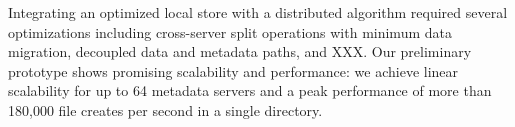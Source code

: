 Integrating an optimized local store with a distributed algorithm required
several optimizations including cross-server split operations with minimum data
migration, decoupled data and metadata paths, and XXX.
Our preliminary prototype shows promising scalability and performance: we
achieve linear scalability for up to 64 metadata servers and a peak performance
of more than 180,000 file creates per second in a single directory.

